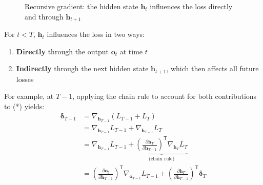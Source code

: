 \begin{notechapter}
\begin{figure}[h]
    \caption{Recursive gradient: the hidden state $\mathbf{h}_t$ influences the loss directly and through $\mathbf{h}_{t+1}$}
    \label{chain-rule-to-bptt:fig:recursive_gradient_unrolled}
\end{figure}

For $t < T$, $\mathbf{h}_t$ influences the loss in two ways:
\begin{enumerate}
    \item \textbf{Directly} through the output $\mathbf{o}_t$ at time $t$
    \item \textbf{Indirectly} through the next hidden state $\mathbf{h}_{t+1}$, which then affects all future losses
\end{enumerate}

For example, at $T-1$, applying the chain rule to account for both contributions to (*) yields:
\begin{align*}
    \bm{\delta}_{T-1} &= \nabla_{\mathbf{h}_{T-1}} \left( L_{T-1} + L_{T} \right) \\
    &= \nabla_{\mathbf{h}_{T-1}} L_{T-1} + \nabla_{\mathbf{h}_{T-1}} L_{T} \\
    &= \nabla_{\mathbf{h}_{T-1}} L_{T-1} + \underbrace{\left(\frac{\partial \mathbf{h}_{T}}
    {\partial \mathbf{h}_{T-1}}\right)^\mathsf{T} \nabla_{\mathbf{h}_{T}}
    L_{T}}_{\text{(chain rule)}} \\
    &= \left(\frac{\partial \mathbf{o}_t}{\partial \mathbf{h}_{T-1}}\right)^\mathsf{T}
    \nabla_{\mathbf{o}_{T-1}} L_{T-1} + \left(\frac{\partial \mathbf{h}_{T}}{\partial
    \mathbf{h}_{T-1}}\right)^\mathsf{T} \bm{\delta}_{T}
\end{align*}


\end{notechapter}
